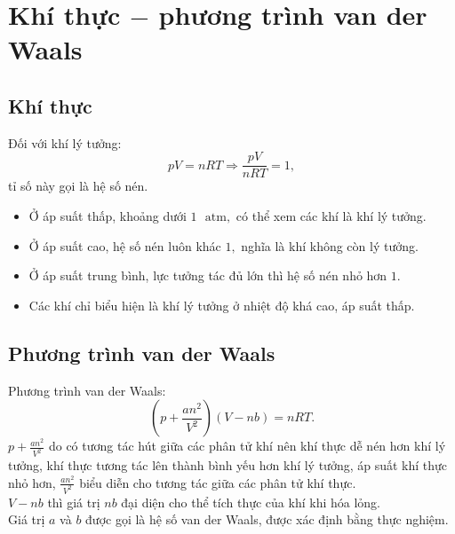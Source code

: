 \section{Khí thực $-$ phương trình van der Waals}
\subsection{Khí thực}
Đối với khí lý tưởng:
$$pV = nRT \Rightarrow \frac{pV}{nRT} = 1,$$
tỉ số này gọi là hệ số nén.
\begin{itemize}
\item Ở áp suất thấp, khoảng dưới $1 \text{ } \mathrm{atm},$ có thể xem các khí là khí lý tưởng.
\item Ở áp suất cao, hệ số nén luôn khác $1,$ nghĩa là khí không còn lý tưởng.
\item Ở áp suất trung bình, lực tưởng tác đủ lớn thì hệ số nén nhỏ hơn $1.$
\item Các khí chỉ biểu hiện là khí lý tưởng ở nhiệt độ khá cao, áp suất thấp.
\end{itemize}
\subsection{Phương trình van der Waals}
Phương trình van der Waals:
$$\left( {p + \frac{an^2}{V^2}} \right) \left( {V - nb} \right) = nRT.$$
$p + \frac{an^2}{V^2}$ do có tương tác hút giữa các phân tử khí nên khí thực dễ nén hơn khí lý tưởng, khí thực tương tác lên thành bình yếu hơn khí lý tưởng, áp suất khí thực nhỏ hơn, $\frac{an^2}{V^2}$ biểu diễn cho tương tác giữa các phân tử khí thực.\\
$V - nb$ thì giá trị $nb$ đại diện cho thể tích thực của khí khi hóa lỏng.\\
Giá trị $a$ và $b$ được gọi là hệ số van der Waals, được xác định bằng thực nghiệm.